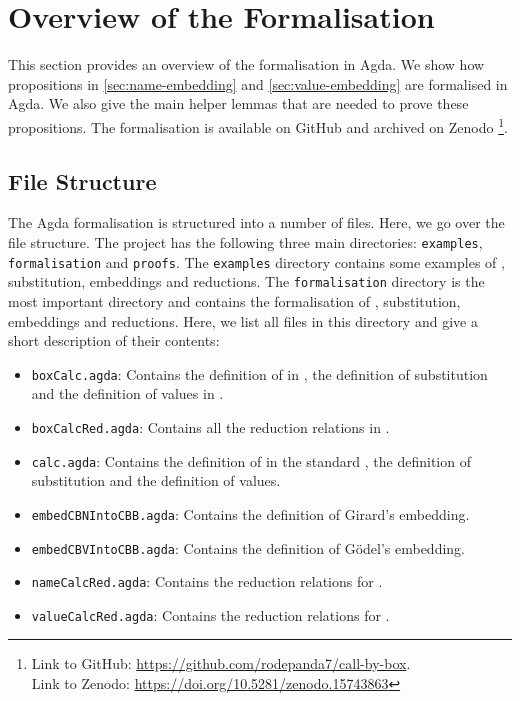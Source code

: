 \section{Overview of the Formalisation}
\label{sec:overview-formalisation}

This section provides an overview of the formalisation in Agda.
We show how propositions in \cref{sec:name-embedding} and \cref{sec:value-embedding} are formalised in Agda.
We also give the main helper lemmas that are needed to prove these propositions.
The formalisation is available on GitHub and archived on Zenodo \cite{floris_reuvers_2025_15743863} \footnote{\noindent Link to GitHub: \url{https://github.com/rodepanda7/call-by-box}. \\ Link to Zenodo: \url{https://doi.org/10.5281/zenodo.15743863}}.


\subsection{File Structure}
\label{sec:file-structure}
The Agda formalisation is structured into a number of files. Here, we go over the file structure.
The project has the following three main directories: \texttt{examples}, \texttt{formalisation} and \texttt{proofs}.
The \texttt{examples} directory contains some examples of \lterms, substitution, embeddings and reductions.
The \texttt{formalisation} directory is the most important directory and contains the formalisation of \lterms, substitution, embeddings and reductions.
Here, we list all files in this directory and give a short description of their contents:
\begin{itemize}
  \item \texttt{boxCalc.agda}: Contains the definition of \lterms in \lab, the definition of substitution and the definition of values in \lab.
  \item \texttt{boxCalcRed.agda}: Contains all the reduction relations in \lab.
  \item \texttt{calc.agda}: Contains the definition of \lterms in the standard \lc, the definition of substitution and the definition of values.
  \item \texttt{embedCBNIntoCBB.agda}: Contains the definition of Girard's embedding.
  \item \texttt{embedCBVIntoCBB.agda}: Contains the definition of Gödel's embedding.
  \item \texttt{nameCalcRed.agda}: Contains the reduction relations for \lan.
  \item \texttt{valueCalcRed.agda}: Contains the reduction relations for \lav.
\end{itemize}

